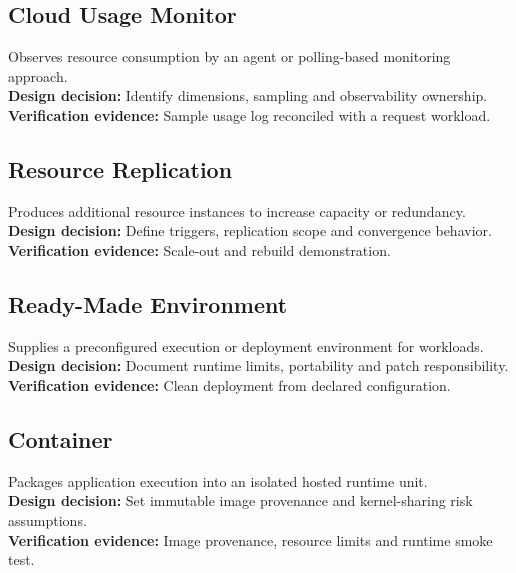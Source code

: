 \documentclass[10pt,letterpaper]{article}
\begin{document}
\subsection{Cloud Usage Monitor}
Observes resource consumption by an agent or polling-based monitoring approach.\\[4pt]
\textbf{Design decision:} Identify dimensions, sampling and observability ownership.\\[3pt]
\textbf{Verification evidence:} Sample usage log reconciled with a request workload.\\[3pt]
\subsection{Resource Replication}
Produces additional resource instances to increase capacity or redundancy.\\[4pt]
\textbf{Design decision:} Define triggers, replication scope and convergence behavior.\\[3pt]
\textbf{Verification evidence:} Scale-out and rebuild demonstration.\\[3pt]
\subsection{Ready-Made Environment}
Supplies a preconfigured execution or deployment environment for workloads.\\[4pt]
\textbf{Design decision:} Document runtime limits, portability and patch responsibility.\\[3pt]
\textbf{Verification evidence:} Clean deployment from declared configuration.\\[3pt]
\subsection{Container}
Packages application execution into an isolated hosted runtime unit.\\[4pt]
\textbf{Design decision:} Set immutable image provenance and kernel-sharing risk assumptions.\\[3pt]
\textbf{Verification evidence:} Image provenance, resource limits and runtime smoke test.\\[3pt]
\end{document}
